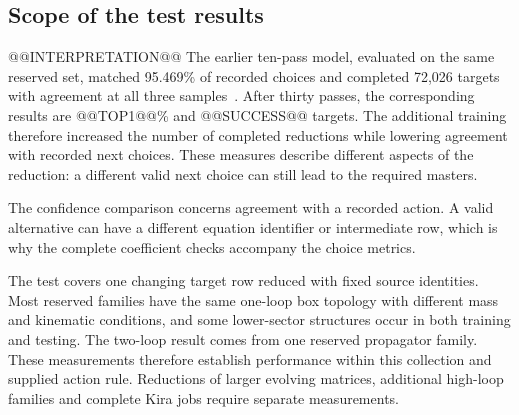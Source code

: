 \subsection{Scope of the test results}
@@INTERPRETATION@@
The earlier ten-pass model, evaluated on the same reserved set, matched
95.469\% of recorded choices and completed 72,026 targets with agreement
at all three samples~\cite{ReductionModelTenEpochTestData}. After
thirty passes, the corresponding results are @@TOP1@@\% and
@@SUCCESS@@ targets. The additional training therefore increased the
number of completed reductions while lowering agreement with recorded
next choices. These measures describe different aspects of the reduction:
a different valid next choice can still lead to the required masters.

The confidence comparison concerns agreement with a recorded action.
A valid alternative can have a different equation identifier or
intermediate row, which is why the complete coefficient checks
accompany the choice metrics.

The test covers one changing target row reduced with fixed source
identities. Most reserved families have the same one-loop box
topology with different mass and kinematic conditions, and some
lower-sector structures occur in both training and testing.
The two-loop result comes from one reserved propagator family.
These measurements therefore establish performance within this
collection and supplied action rule. Reductions of larger evolving
matrices, additional high-loop families and complete Kira jobs
require separate measurements.
